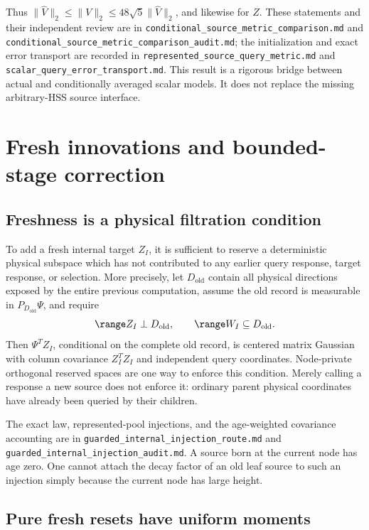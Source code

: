 \documentclass[11pt,oneside,openany,a4paper]{book}
\numberwithin{equation}{chapter}
\theoremstyle{definition}
\theoremstyle{remark}
\newcommand{\sourcefile}[1]{{\small\nolinkurl{#1}}}
\begin{document}
Thus
$\|\widehat V\|_2\leq\|V\|_2\leq48\sqrt5\|\widehat V\|_2$,
and likewise for $Z$.  These statements and their independent review
are in \sourcefile{conditional_source_metric_comparison.md} and
\sourcefile{conditional_source_metric_comparison_audit.md}; the
initialization and exact error transport are recorded in
\sourcefile{represented_source_query_metric.md} and
\sourcefile{scalar_query_error_transport.md}.  This result is a rigorous
bridge between actual and conditionally averaged scalar models.  It
does not replace the missing arbitrary-HSS source interface.

\chapter{Fresh innovations and bounded-stage correction}
\label{upd:chap:route-fresh}

\section{Freshness is a physical filtration condition}

To add a fresh internal target $Z_I$, it is sufficient to reserve a
deterministic physical subspace which has not contributed to any
earlier query response, target response, or selection.  More precisely,
let $D_{\mathrm{old}}$ contain all physical directions exposed by the
entire previous computation, assume the old record is measurable in
$P_{D_{\mathrm{old}}}\Psi$, and require
\[
 \range Z_I\perp D_{\mathrm{old}},\qquad
 \range W_I\subseteq D_{\mathrm{old}}.
\]
Then $\Psi^TZ_I$, conditional on the complete old record, is centered
matrix Gaussian with column covariance $Z_I^TZ_I$ and independent
query coordinates.  Node-private orthogonal reserved spaces are one
way to enforce this condition.  Merely calling a response a new source
does not enforce it: ordinary parent physical coordinates have already
been queried by their children.

The exact law, represented-pool injections, and the age-weighted
covariance accounting are in
\sourcefile{guarded_internal_injection_route.md} and
\sourcefile{guarded_internal_injection_audit.md}.  A source born at the
current node has age zero.  One cannot attach the decay factor of an
old leaf source to such an injection simply because the current node
has large height.

\section{Pure fresh resets have uniform moments}
\end{document}
